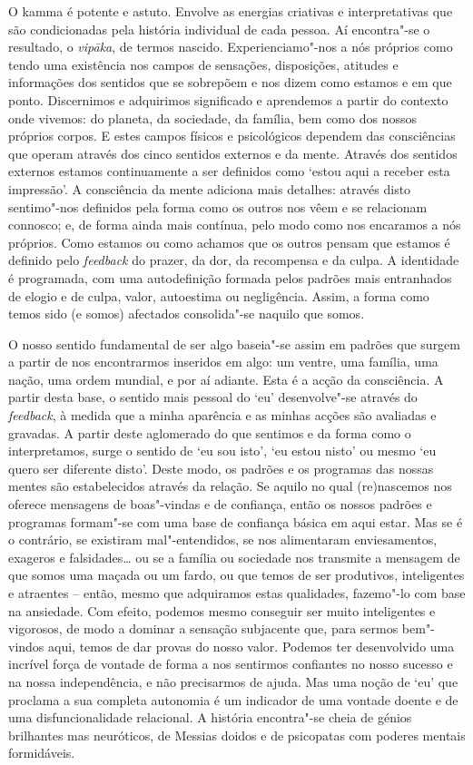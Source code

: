 O kamma é potente e astuto. Envolve as energias criativas e interpretativas que são condicionadas pela história individual de cada pessoa. Aí encontra"-se o resultado, o \emph{vipāka}, de termos nascido. Experienciamo"-nos a nós próprios como tendo uma existência nos campos de sensações, disposições, atitudes e informações dos sentidos que se sobrepõem e nos dizem como estamos e em que ponto. Discernimos e adquirimos significado e aprendemos a partir do contexto onde vivemos: do planeta, da sociedade, da família, bem como dos nossos próprios corpos. E estes campos físicos e psicológicos dependem das consciências que operam através dos cinco sentidos externos e da mente. Através dos sentidos externos estamos continuamente a ser definidos como `estou aqui a receber esta impressão'. A consciência da mente adiciona mais detalhes: através disto sentimo"-nos definidos pela forma como os outros nos vêem e se relacionam connosco; e, de forma ainda mais contínua, pelo modo como nos encaramos a nós próprios. Como estamos ou como achamos que os outros pensam que estamos é definido pelo \emph{feedback} do prazer, da dor, da recompensa e da culpa. A identidade é programada, com uma autodefinição formada pelos padrões mais entranhados de elogio e de culpa, valor, autoestima ou negligência. Assim, a forma como temos sido (e somos) afectados consolida"-se naquilo que somos.

O nosso sentido fundamental de ser algo baseia"-se assim em padrões que surgem a partir de nos encontrarmos inseridos em algo: um ventre, uma família, uma nação, uma ordem mundial, e por aí adiante. Esta é a acção da consciência. A partir desta base, o sentido mais pessoal do `eu' desenvolve"-se através do \emph{feedback}, à medida que a minha aparência e as minhas acções são avaliadas e gravadas. A partir deste aglomerado do que sentimos e da forma como o interpretamos, surge o sentido de `eu sou isto', `eu estou nisto' ou mesmo `eu quero ser diferente disto'. Deste modo, os padrões e os programas das nossas mentes são estabelecidos através da relação. Se aquilo no qual (re)nascemos nos oferece mensagens de boas"-vindas e de confiança, então os nossos padrões e programas formam"-se com uma base de confiança básica em aqui estar. Mas se é o contrário, se existiram mal"-entendidos, se nos alimentaram enviesamentos, exageros e falsidades\ldots{} ou se a família ou sociedade nos transmite a mensagem de que somos uma maçada ou um fardo, ou que temos de ser produtivos, inteligentes e atraentes -- então, mesmo que adquiramos estas qualidades, fazemo"-lo com base na ansiedade. Com efeito, podemos mesmo conseguir ser muito inteligentes e vigorosos, de modo a dominar a sensação subjacente que, para sermos bem"-vindos aqui, temos de dar provas do nosso valor. Podemos ter desenvolvido uma incrível força de vontade de forma a nos sentirmos confiantes no nosso sucesso e na nossa independência, e não precisarmos de ajuda. Mas uma noção de `eu' que proclama a sua completa autonomia é um indicador de uma vontade doente e de uma disfuncionalidade relacional. A história encontra"-se cheia de génios brilhantes mas neuróticos, de Messias doidos e de psicopatas com poderes mentais formidáveis.


